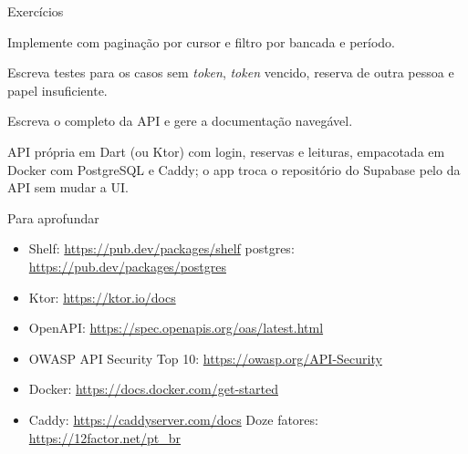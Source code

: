 \documentclass[aspectratio=169,10pt]{beamer}
\begin{document}
\begin{frame}{Exercícios}
  \begin{exercicio}
    Implemente  com paginação por cursor e filtro por bancada e período.
  \end{exercicio}
  \begin{exercicio}
    Escreva testes para os casos sem \emph{token}, \emph{token} vencido, reserva de outra pessoa e papel insuficiente.
  \end{exercicio}
  \begin{exercicio}
    Escreva o  completo da API e gere a documentação navegável.
  \end{exercicio}
  \begin{projeto}
    API própria em Dart (ou Ktor) com login, reservas e leituras, empacotada em Docker com PostgreSQL e Caddy; o app troca o repositório do Supabase pelo da API sem mudar a UI.
  \end{projeto}
\end{frame}

\begin{frame}{Para aprofundar}
  \small
  \begin{itemize}
    \item Shelf: \url{https://pub.dev/packages/shelf} \quad postgres: \url{https://pub.dev/packages/postgres}
    \item Ktor: \url{https://ktor.io/docs}
    \item OpenAPI: \url{https://spec.openapis.org/oas/latest.html}
    \item OWASP API Security Top 10: \url{https://owasp.org/API-Security}
    \item Docker: \url{https://docs.docker.com/get-started}
    \item Caddy: \url{https://caddyserver.com/docs} \quad Doze fatores: \url{https://12factor.net/pt_br}
  \end{itemize}
\end{frame}
\end{document}
